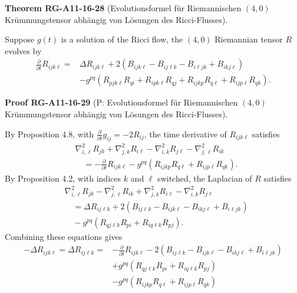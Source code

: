\documentclass[10pt, letterpaper]{article}
\newcommand{\CustomHeading}[3]{%
  \par\medskip\noindent%
  \textbf{#1 #2} \textnormal{(#3)}.\enskip%
}
\newenvironment{THEO}[2]{\CustomHeading{Theorem}{#1}{#2}}{}
\newenvironment{PROOF}[2]{\CustomHeading{Proof}{#1}{#2}}{}
\begin{document}
\begin{THEO}{RG-A11-16-28}{Evolutionsformel für Riemannischen $(4,0)$ Krümmungstensor abhängig von Lösungen des Ricci-Flusses}
Suppose $g(t)$ is a solution of the Ricci flow, the $(4,0)$ Riemannian tensor $R$ evolves by
$$
\begin{aligned}
\frac{\partial}{\partial t} R_{i j k \ell}= & \Delta R_{i j k \ell}+2\left(B_{i j k \ell}-B_{i j \ell k}-B_{i \ell j k}+B_{i k j \ell}\right) \\
& -g^{p q}\left(R_{p j k \ell} R_{q i}+R_{i p k \ell} R_{q j}+R_{i j k p} R_{q \ell}+R_{i j p \ell} R_{q k}\right) .
\end{aligned}
$$
\end{THEO}

\begin{PROOF}{RG-A11-16-29}{P: Evolutionsformel für Riemannischen $(4,0)$ Krümmungstensor abhängig von Lösungen des Ricci-Flusses}
By Proposition 4.8, with $\frac{\partial}{\partial t} g_{i j}=-2 R_{i j}$, the time derivative of $R_{i j k \ell}$ satisfies
$$
\begin{aligned}
& \nabla_{i, \ell}^{2} R_{j k}+\nabla_{j, k}^{2} R_{i \ell}-\nabla_{i, k}^{2} R_{j \ell}-\nabla_{j, \ell}^{2} R_{i k} \\
& \quad=-\frac{\partial}{\partial t} R_{i j k \ell}-g^{p q}\left(R_{i j k p} R_{q \ell}+R_{i j p \ell} R_{q k}\right) .
\end{aligned}
$$
By Proposition 4.2, with indices $k$ and $\ell$ switched, the Laplacian of $R$ satisfies
$$
\begin{aligned}
& \nabla_{i, \ell}^{2} R_{j k}-\nabla_{j, \ell}^{2} R_{i k}+\nabla_{j, k}^{2} R_{i \ell}-\nabla_{i, k}^{2} R_{j \ell} \\
& \quad=\Delta R_{i j \ell k}+2\left(B_{i j \ell k}-B_{i j k \ell}-B_{i k j \ell}+B_{i \ell j k}\right) \\
& \quad-g^{p q}\left(R_{q j \ell k} R_{p i}+R_{i q \ell k} R_{p j}\right) .
\end{aligned}
$$
Combining these equations gives
$$
\begin{aligned}
-\Delta R_{i j k \ell}=\Delta R_{i j \ell k}= & -\frac{\partial}{\partial t} R_{i j k \ell}-2\left(B_{i j \ell k}-B_{i j k \ell}-B_{i k j \ell}+B_{i \ell j k}\right) \\
& +g^{p q}\left(R_{q j \ell k} R_{p i}+R_{i q \ell k} R_{p j}\right) \\
& -g^{p q}\left(R_{i j k p} R_{q \ell}+R_{i j p \ell} R_{q k}\right)
\end{aligned}
$$
\end{PROOF}
\end{document}

